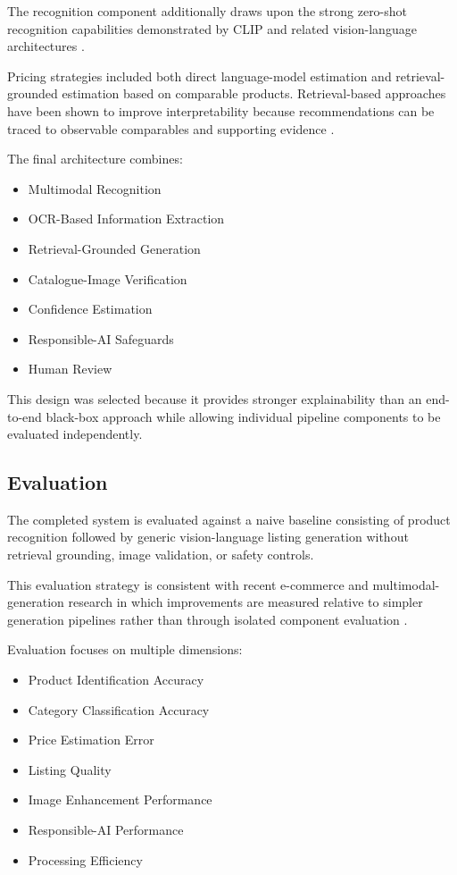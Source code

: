 \documentclass[conference]{IEEEtran}
\begin{document}
The recognition component additionally draws upon the strong
zero-shot recognition capabilities demonstrated by CLIP and related
vision-language architectures \cite{radford2021clip}.

Pricing strategies included both direct language-model estimation
and retrieval-grounded estimation based on comparable products.
Retrieval-based approaches have been shown to improve
interpretability because recommendations can be traced to observable
comparables and supporting evidence \cite{llp2025}.

The final architecture combines:

\begin{itemize}
\item Multimodal Recognition
\item OCR-Based Information Extraction
\item Retrieval-Grounded Generation
\item Catalogue-Image Verification
\item Confidence Estimation
\item Responsible-AI Safeguards
\item Human Review
\end{itemize}

This design was selected because it provides stronger
explainability than an end-to-end black-box approach while allowing
individual pipeline components to be evaluated independently.

\subsection{Evaluation}

The completed system is evaluated against a naive baseline
consisting of product recognition followed by generic
vision-language listing generation without retrieval grounding,
image validation, or safety controls.

This evaluation strategy is consistent with recent e-commerce and
multimodal-generation research in which improvements are measured
relative to simpler generation pipelines rather than through
isolated component evaluation \cite{li2024modict}.

Evaluation focuses on multiple dimensions:

\begin{itemize}
\item Product Identification Accuracy
\item Category Classification Accuracy
\item Price Estimation Error
\item Listing Quality
\item Image Enhancement Performance
\item Responsible-AI Performance
\item Processing Efficiency
\end{itemize}
\end{document}
